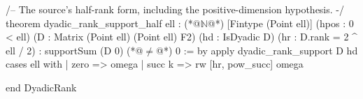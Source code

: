 /-- The source's half-rank form, including the positive-dimension hypothesis. -/
theorem dyadic_rank_support_half {ell : (*@$\mathbb{N}$@*)} [Fintype (Point ell)]
    (hpos : 0 < ell) (D : Matrix (Point ell) (Point ell) F2) (hd : IsDyadic D)
    (hr : D.rank = 2 ^ ell / 2) : supportSum (D 0) (*@$\ne$@*) 0 := by
  apply dyadic_rank_support D hd
  cases ell with
  | zero => omega
  | succ k =>
    rw [hr, pow_succ]
    omega

end DyadicRank
